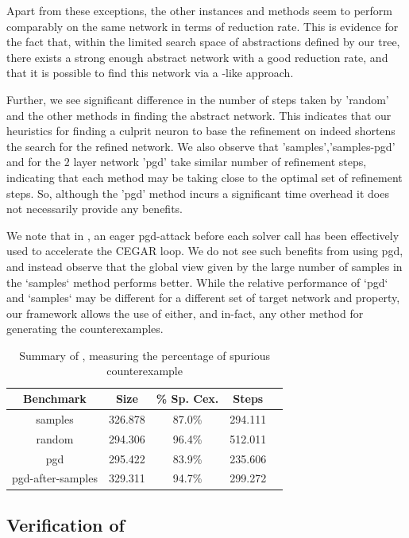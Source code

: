 Apart from these exceptions, the other instances and methods seem to perform
comparably on the same network in terms of reduction rate. This is evidence for
the fact that, within the limited search space of abstractions defined by our
tree, there exists a strong enough abstract network with a good reduction rate,
and that it is possible to find this network via a \cegar-like approach. 

Further, we see significant difference in the number of steps taken by 'random'
and the other methods in finding the abstract network. This indicates that our
heuristics for finding a culprit neuron to base the refinement on indeed
shortens the search for the refined network. We also observe that
'samples','samples-pgd' and for the $2$ layer network 'pgd' take similar number
of refinement steps, indicating that each method may be taking close to the
optimal set of refinement steps. So, although the 'pgd' method
incurs a significant time overhead  it does not necessarily
provide any benefits. 

We note that in \cite{cleverest-nn}, an eager pgd-attack before each solver call
has been effectively used to accelerate the CEGAR loop. We do not see such
benefits from using pgd, and instead observe that the global view given by
the large number of samples in the `samples` method performs better. While the
relative performance of `pgd` and `samples` may be different for a different set
of target network and property, our framework allows the use of either, and
in-fact, any other method for generating the counterexamples.

\begin{table}
\begin{tabular}{|c|c|c|c|c|}
\hline
Benchmark         &    Size  & \% Sp. Cex. & Steps   \\
\hline
samples           & 326.878  &  87.0\%     & 294.111  \\
random            & 294.306  &  96.4\%     & 512.011  \\
pgd               & 295.422  &  83.9\%     & 235.606  \\
pgd-after-samples & 329.311  &  94.7\%     & 299.272  \\
\hline
\end{tabular}
\caption{Summary of \acasxu, measuring the percentage of spurious counterexample }
\label{t:acas-ncex}
\end{table}

\subsection{Verification of \acasxu}

